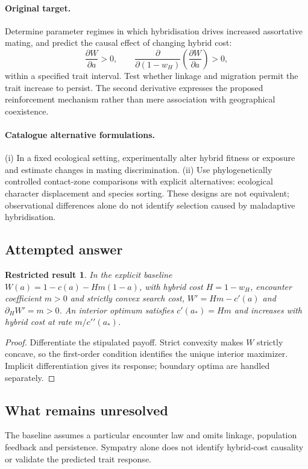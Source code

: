 \documentclass[11pt]{article}
\newtheorem{attemptresult}{Restricted result}[section]
\begin{document}
\paragraph{Original target.}
Determine parameter regimes in which hybridisation drives increased assortative mating, and predict the causal effect of changing hybrid cost:
\[
\frac{\partial W}{\partial a}>0,
\qquad
\frac{\partial}{\partial(1-w_H)}\left(\frac{\partial W}{\partial a}\right)>0,
\]
within a specified trait interval. Test whether linkage and migration permit the trait increase to persist. The second derivative expresses the proposed reinforcement mechanism rather than mere association with geographical coexistence.
\paragraph{Catalogue alternative formulations.}
(i) In a fixed ecological setting, experimentally alter hybrid fitness or exposure and estimate changes in mating discrimination. (ii) Use phylogenetically controlled contact-zone comparisons with explicit alternatives: ecological character displacement and species sorting. These designs are not equivalent; observational differences alone do not identify selection caused by maladaptive hybridisation.
\subsection{Attempted answer}
\begin{attemptresult}
In the explicit baseline $W(a)=1-c(a)-Hm(1-a)$, with hybrid cost $H=1-w_H$, encounter coefficient $m>0$ and strictly convex search cost, $W\prime=Hm-c\prime(a)$ and $\partial_H W\prime=m>0$. An interior optimum satisfies $c\prime(a_*)=Hm$ and increases with hybrid cost at rate $m/c\prime\prime(a_*)$.
\end{attemptresult}
\begin{proof}
Differentiate the stipulated payoff. Strict convexity makes $W$ strictly concave, so the first-order condition identifies the unique interior maximizer. Implicit differentiation gives its response; boundary optima are handled separately.
\end{proof}
\subsection{What remains unresolved}
The baseline assumes a particular encounter law and omits linkage, population feedback and persistence. Sympatry alone does not identify hybrid-cost causality or validate the predicted trait response.
\end{document}
